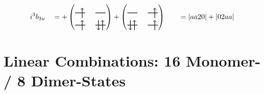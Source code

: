 \documentclass{article}
\begin{document}
\[i^3 b_{3u}
\quad = + \left(\begin{tikzpicture}[baseline={(current bounding box.center)}]
    \draw[thick] (0,0) -- (0.5,0); %
    \draw[thick] (1,0) -- (1.5,0); %
    \draw[thick] (0,-0.6) -- (0.5,-0.6); %
    \draw[thick] (1,-0.6) -- (1.5,-0.6); %
\draw[->, thick] (0.35, -0.25) -- (0.35, 0.25); 
\draw[-> , thick] (0.35, -0.85) -- (0.35, -0.35); 
 \draw[-> , thick] (1.35, -0.85) -- (1.35, -0.35); 
\draw[<- , thick] (1.15, -0.85) -- (1.15, -0.35); 
\end{tikzpicture}\right)+\left(\begin{tikzpicture}[baseline={(current bounding box.center)}]
    \draw[thick] (0,0) -- (0.5,0); %
    \draw[thick] (1,0) -- (1.5,0); %
    \draw[thick] (0,-0.6) -- (0.5,-0.6); %
    \draw[thick] (1,-0.6) -- (1.5,-0.6); %
\draw[->, thick] (1.35, -0.25) -- (1.35, 0.25); 
\draw[-> , thick] (0.35, -0.85) -- (0.35, -0.35); 
\draw[<- , thick] (0.15, -0.85) -- (0.15, -0.35); 
 \draw[-> , thick] (1.35, -0.85) -- (1.35, -0.35); 
\end{tikzpicture}\right) \qquad = \left|aa20\right|+\left|02aa\right| \]


\newpage


\section{Linear Combinations: 16 Monomer- / 8 Dimer-States}
\end{document}
